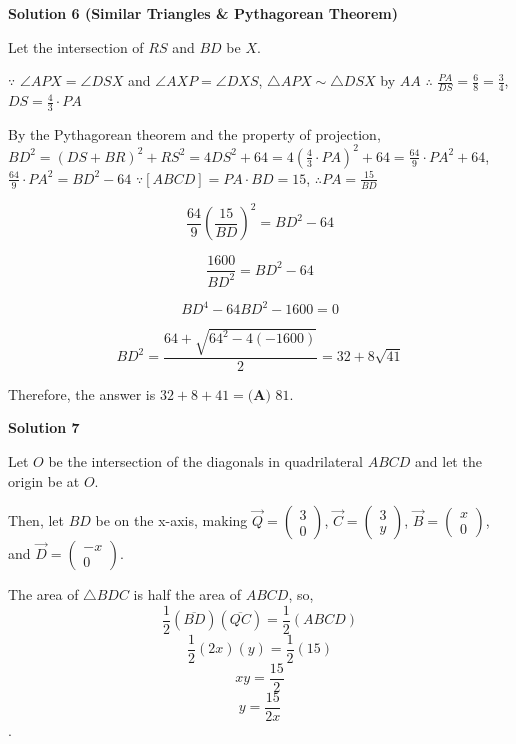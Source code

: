 \begin{enumerate}
 



\textbf{Solution 6 (Similar Triangles & Pythagorean Theorem)}

Let the intersection of $RS$ and $BD$ be $X$. 

 $\because$ $\angle APX = \angle DSX$ and $\angle AXP = \angle DXS$, $\triangle APX \sim \triangle DSX$ by $AA$
$\therefore$ $\frac{PA}{DS} = \frac68 = \frac34$, $DS = \frac43 \cdot PA$

 By the Pythagorean theorem and the property of projection, $BD^2 = (DS+BR)^2 + RS^2 = 4DS^2 + 64 = 4(\frac43 \cdot PA)^2 + 64 = \frac{64}{9} \cdot PA^2 + 64$, $\frac{64}{9} \cdot PA^2 = BD^2 - 64$
$\because [ABCD] = PA \cdot BD = 15$, $\therefore PA = \frac{15}{BD}$

 \[\frac{64}{9} (\frac{15}{BD})^2 = BD^2 - 64\]

 \[\frac{1600}{BD^2} = BD^2 - 64\]

 \[BD^4 - 64 BD^2 - 1600 = 0\]

 \[BD^2 = \frac{64 + \sqrt{64^2 - 4 (-1600)}}{2} = 32 + 8 \sqrt{41}\]

 Therefore, the answer is $32 + 8 + 41 = \boxed{\textbf{(A) } 81}$.

 



\textbf{Solution 7}

Let $O$ be the intersection of the diagonals in quadrilateral $ABCD$ and let the origin be at $O$.

 Then, let $BD$ be on the x-axis, making $\vec{Q}=\begin{pmatrix}3 \\ 0\end{pmatrix}$, $\vec{C}=\begin{pmatrix}3 \\ y\end{pmatrix}$, $\vec{B}=\begin{pmatrix}x \\ 0\end{pmatrix}$, and $\vec{D}=\begin{pmatrix}-x \\ 0\end{pmatrix}$.

 The area of $\triangle BDC$ is half the area of $ABCD$, so,
 \[\frac{1}{2}(\overline{BD})(\overline{QC})=\frac{1}{2}(ABCD)\]
 \[\frac{1}{2}(2x)(y)=\frac{1}{2}(15)\]
 \[xy=\frac{15}{2}\]
 \[y= \frac{15}{2x}\].


\end{enumerate}
